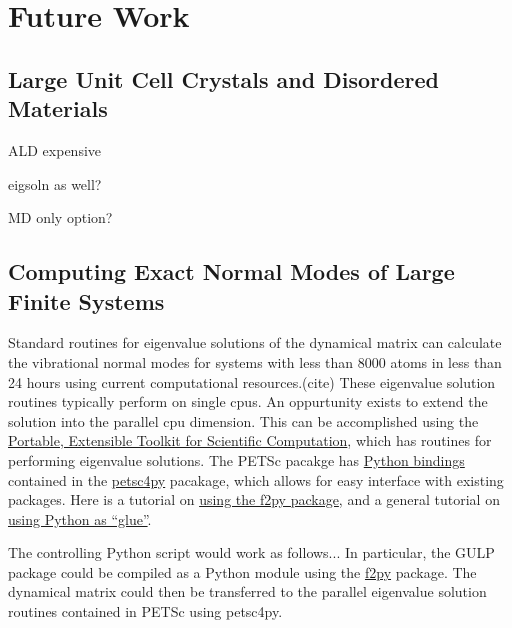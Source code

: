 \section{Future Work}

\subsection{Large Unit Cell Crystals and Disordered Materials}

ALD expensive

eigsoln as well?

MD only option?

\subsection{Computing Exact Normal Modes of Large Finite Systems}

Standard routines for eigenvalue solutions of the dynamical matrix can 
calculate the vibrational normal modes for systems with less than 
8000 atoms 
in less than 24 hours using current computational resources.(cite) 
These eigenvalue solution routines typically perform on single cpus. 
An oppurtunity exists to extend the solution into the parallel cpu 
dimension. This can be accomplished using the 
\href{http://www.mcs.anl.gov/petsc/}{Portable, Extensible 
Toolkit for Scientific Computation}, which has routines for performing 
eigenvalue solutions. The PETSc pacakge has 
\href{http://wiki.python.org/moin/IntegratingPythonWithOtherLanguages}
{Python bindings} contained in the 
\href{https://code.google.com/p/petsc4py/}{petsc4py} 
pacakage, which allows for easy interface 
with existing packages.  
Here is a tutorial on 
\href{https://github.com/thehackerwithin/PyTrieste/wiki/F2Py}
{using the f2py package}, and a general tutorial on 
\href{http://docs.scipy.org/doc/numpy/user/c-info.python-as-glue.html}
{using Python as ``glue''}. 

The controlling Python script would work as follows...
In particular, the GULP package could be 
compiled as a Python module using the 
\href{https://code.google.com/p/f2py/}{f2py} package. The dynamical 
matrix could then be transferred to the parallel eigenvalue solution 
routines contained in PETSc using petsc4py.


